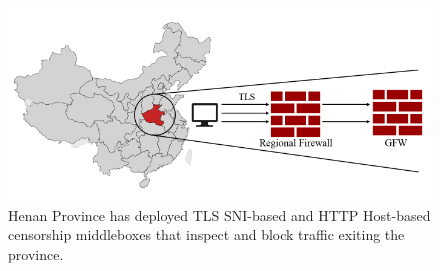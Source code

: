 \documentclass[conference,compsoc]{IEEEtran}
\begin{document}
\begin{figure}[t]
  \centering
  \includegraphics[width=\columnwidth]{figures/two-firewalls.pdf}
  \caption{
    Henan Province has deployed TLS SNI-based and HTTP Host-based censorship middleboxes
    that inspect and block traffic exiting the province.
    }
  \label{fig:two-firewalls}
\end{figure}


\end{document}
